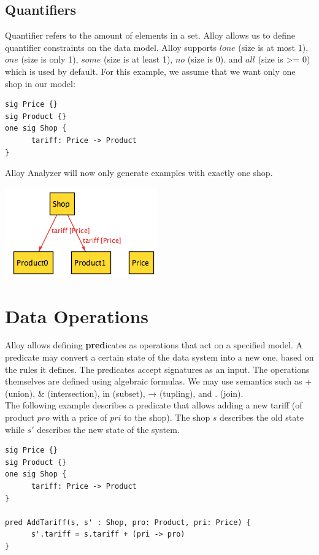 \documentclass[oneside]{book}
\begin{document}
\subsection{Quantifiers}

Quantifier refers to the amount of elements in a set. Alloy allows us to define quantifier constraints on the data model. Alloy supports $lone$ (size is at most 1), $one$ (size is only 1), $some$ (size is at least 1), $no$ (size is 0). and $all$ (size is >= 0) which is used by default. For this example, we assume that we want only one shop in our model:

\begin{lstlisting}
sig Price {}
sig Product {}
one sig Shop {
	  tariff: Price -> Product
}
\end{lstlisting}

Alloy Analyzer will now only generate examples with exactly one shop. 

\begin{center}
\includegraphics[scale=0.6]{shop2}
\end{center}

\newpage

\section{Data Operations}
Alloy allows defining \textbf{pred}icates as operations that act on a specified model. A predicate may convert a certain state of the data system into a new one, based on the rules it defines. The predicates accept signatures as an input. The operations themselves are defined using algebraic formulas. We may use semantics such as + (union), \& (intersection), in (subset), → (tupling), and . (join).\\

The following example describes a predicate that allows adding a new tariff (of product $pro$ with a price of $pri$ to the shop). The shop $s$ describes the old state while $s'$ describes the new state of the system.

\begin{lstlisting}
sig Price {}
sig Product {}
one sig Shop {
	  tariff: Price -> Product
}

pred AddTariff(s, s' : Shop, pro: Product, pri: Price) {
	  s'.tariff = s.tariff + (pri -> pro)
}
\end{lstlisting}
\end{document}
